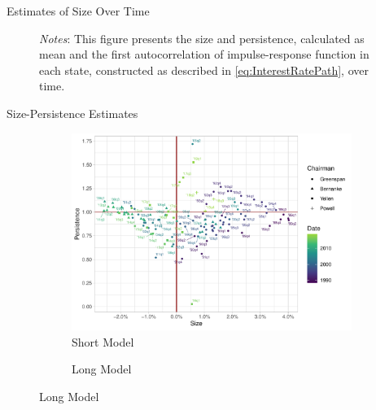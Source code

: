\documentclass[10pt,aspectratio=169]{beamer}
\begin{document}
\begin{frame}{Estimates of Size Over Time}
\begin{figure}[!htbp]
\begin{subfigure}[b]{0.49\textwidth}
        \end{subfigure} \vspace{-5ex}
            {\begin{flushleft}\tiny\textit{Notes}: This figure presents the size and persistence, calculated as mean and the first autocorrelation of impulse-response function in each state, constructed as described in \vref{eq:InterestRatePath}, over time. \end{flushleft}}
      \end{figure}
      
\end{frame}



\begin{frame}{Size-Persistence Estimates}
    \begin{figure}[!hpbt]\centering
        \begin{minipage}{\textwidth}\centering
            \begin{subfigure}[b]{0.5\textwidth}
                \caption{Short Model}
                \label{fig:size_persistence_short}
                \includegraphics[width=\linewidth]{actual_size_persistence_short.pdf}
            \end{subfigure}%
          \begin{subfigure}[b]{0.5\textwidth}
            \caption{Long Model}
            \label{fig:size_persistence_long}

\end{subfigure}
\end{minipage}
\end{figure}
\end{frame}
\end{document}
